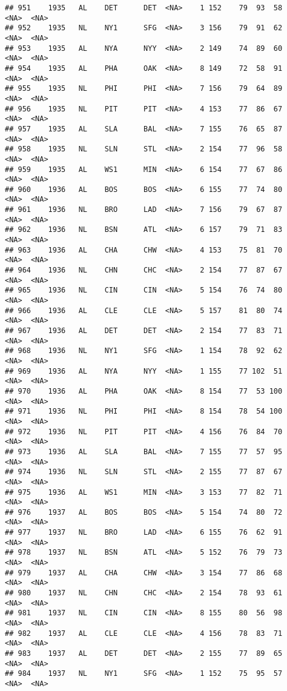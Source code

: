 \documentclass[]{article}
\begin{document}
\begin{verbatim}
## 951    1935   AL    DET      DET  <NA>    1 152    79  93  58   <NA>  <NA>
## 952    1935   NL    NY1      SFG  <NA>    3 156    79  91  62   <NA>  <NA>
## 953    1935   AL    NYA      NYY  <NA>    2 149    74  89  60   <NA>  <NA>
## 954    1935   AL    PHA      OAK  <NA>    8 149    72  58  91   <NA>  <NA>
## 955    1935   NL    PHI      PHI  <NA>    7 156    79  64  89   <NA>  <NA>
## 956    1935   NL    PIT      PIT  <NA>    4 153    77  86  67   <NA>  <NA>
## 957    1935   AL    SLA      BAL  <NA>    7 155    76  65  87   <NA>  <NA>
## 958    1935   NL    SLN      STL  <NA>    2 154    77  96  58   <NA>  <NA>
## 959    1935   AL    WS1      MIN  <NA>    6 154    77  67  86   <NA>  <NA>
## 960    1936   AL    BOS      BOS  <NA>    6 155    77  74  80   <NA>  <NA>
## 961    1936   NL    BRO      LAD  <NA>    7 156    79  67  87   <NA>  <NA>
## 962    1936   NL    BSN      ATL  <NA>    6 157    79  71  83   <NA>  <NA>
## 963    1936   AL    CHA      CHW  <NA>    4 153    75  81  70   <NA>  <NA>
## 964    1936   NL    CHN      CHC  <NA>    2 154    77  87  67   <NA>  <NA>
## 965    1936   NL    CIN      CIN  <NA>    5 154    76  74  80   <NA>  <NA>
## 966    1936   AL    CLE      CLE  <NA>    5 157    81  80  74   <NA>  <NA>
## 967    1936   AL    DET      DET  <NA>    2 154    77  83  71   <NA>  <NA>
## 968    1936   NL    NY1      SFG  <NA>    1 154    78  92  62   <NA>  <NA>
## 969    1936   AL    NYA      NYY  <NA>    1 155    77 102  51   <NA>  <NA>
## 970    1936   AL    PHA      OAK  <NA>    8 154    77  53 100   <NA>  <NA>
## 971    1936   NL    PHI      PHI  <NA>    8 154    78  54 100   <NA>  <NA>
## 972    1936   NL    PIT      PIT  <NA>    4 156    76  84  70   <NA>  <NA>
## 973    1936   AL    SLA      BAL  <NA>    7 155    77  57  95   <NA>  <NA>
## 974    1936   NL    SLN      STL  <NA>    2 155    77  87  67   <NA>  <NA>
## 975    1936   AL    WS1      MIN  <NA>    3 153    77  82  71   <NA>  <NA>
## 976    1937   AL    BOS      BOS  <NA>    5 154    74  80  72   <NA>  <NA>
## 977    1937   NL    BRO      LAD  <NA>    6 155    76  62  91   <NA>  <NA>
## 978    1937   NL    BSN      ATL  <NA>    5 152    76  79  73   <NA>  <NA>
## 979    1937   AL    CHA      CHW  <NA>    3 154    77  86  68   <NA>  <NA>
## 980    1937   NL    CHN      CHC  <NA>    2 154    78  93  61   <NA>  <NA>
## 981    1937   NL    CIN      CIN  <NA>    8 155    80  56  98   <NA>  <NA>
## 982    1937   AL    CLE      CLE  <NA>    4 156    78  83  71   <NA>  <NA>
## 983    1937   AL    DET      DET  <NA>    2 155    77  89  65   <NA>  <NA>
## 984    1937   NL    NY1      SFG  <NA>    1 152    75  95  57   <NA>  <NA>

\end{verbatim}
\end{document}
